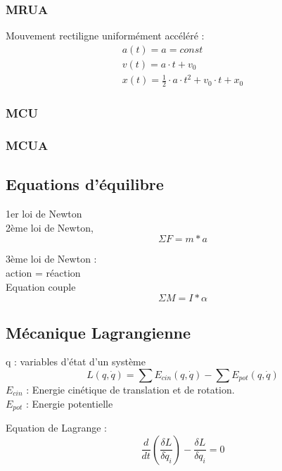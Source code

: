 \subsubsection{MRUA}
Mouvement rectiligne uniformément accéléré :
\begin{eqnarray}
a(t)=a=const\\
v(t)=a \cdot t+v_0\\
x(t)=\frac{1}{2} \cdot a \cdot t^2+v_0 \cdot t + x_0
\end{eqnarray}

\subsubsection{MCU}
\subsubsection{MCUA}


\subsection{Equations d'équilibre}
1er loi de Newton \\


2ème loi de Newton,
\begin{equation}
\Sigma F= m*a
\end{equation}

3ème loi de Newton : \\

action = réaction \\

Equation couple
\begin{equation}
\Sigma M=I*\alpha
\end{equation}

\subsection{Mécanique Lagrangienne}
q : variables d'état d'un système
\begin{equation}
L(q,\dot{q})=\sum E_{cin}(q,\dot{q}) - \sum E_{pot}(q,\dot{q})
\end{equation}
$E_{cin}$ : Energie cinétique de translation et de rotation.\\
$E_{pot}$ : Energie potentielle

Equation de Lagrange :
\begin{equation}
\frac{d}{dt}(\frac{\delta L}{\delta \dot{q}_i})-\frac{\delta L}{\delta q_i}=0
\end{equation}


